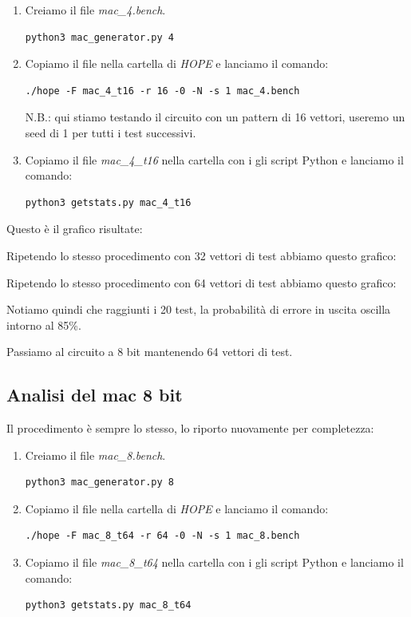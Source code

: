 \documentclass[12pt, letterpaper]{article}
\begin{document}
\begin{enumerate}
\item Creiamo il file \textit{mac\_4.bench}.
\begin{lstlisting}
python3 mac_generator.py 4
\end{lstlisting}
\item Copiamo il file nella cartella di \textit{HOPE} e lanciamo il comando:
\begin{lstlisting}
./hope -F mac_4_t16 -r 16 -0 -N -s 1 mac_4.bench
\end{lstlisting}
N.B.: qui stiamo testando il circuito con un pattern di 16 vettori, useremo un seed di 1 per tutti i test successivi.
\item Copiamo il file \textit{mac\_4\_t16} nella cartella con i gli script Python e lanciamo il comando:
\begin{lstlisting}
python3 getstats.py mac_4_t16
\end{lstlisting}
\end{enumerate}

Questo è il grafico risultate:



Ripetendo lo stesso procedimento con 32 vettori di test abbiamo questo grafico:



Ripetendo lo stesso procedimento con 64 vettori di test abbiamo questo grafico:



Notiamo quindi che raggiunti i 20 test, la probabilità di errore in uscita oscilla intorno al 85\%.

Passiamo al circuito a 8 bit mantenendo 64 vettori di test.

\subsection{Analisi del mac 8 bit}

Il procedimento è sempre lo stesso, lo riporto nuovamente per completezza:

\begin{enumerate}
\item Creiamo il file \textit{mac\_8.bench}.
\begin{lstlisting}
python3 mac_generator.py 8
\end{lstlisting}
\item Copiamo il file nella cartella di \textit{HOPE} e lanciamo il comando:
\begin{lstlisting}
./hope -F mac_8_t64 -r 64 -0 -N -s 1 mac_8.bench
\end{lstlisting}
\item Copiamo il file \textit{mac\_8\_t64} nella cartella con i gli script Python e lanciamo il comando:
\begin{lstlisting}
python3 getstats.py mac_8_t64
\end{lstlisting}
\end{enumerate}
\end{document}
